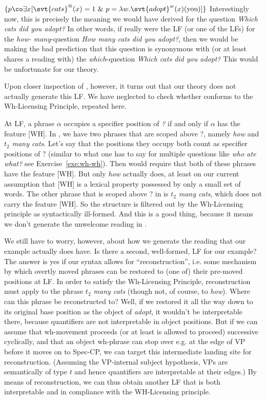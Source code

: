 \ex $\{p\co \exists x [\svt{cats}^{@}(x)=1\ \&\
p = \lambda w.\svt{adopt}^{w}(x)(\text{you})]\}$
\xe
%
Interestingly now, this is precisely the meaning we would have derived for the
question \emph{Which cats did you adopt?} In other words, if
 really were the LF (or one of the LFs) for the \emph{how-
  many}-question \emph{How many cats did you adopt?}, then we would be making
the bad prediction that this question is synonymous with (or at least shares a
reading with) the \emph{which}-question \emph{Which cats did you adopt?} This
would be unfortunate for our theory.

Upon closer inspection of , however, it turns out that our
theory does not actually generate this LF. We have neglected to check whether
\refx[d]{ex:LF-cats} conforms to the Wh-Licensing Principle, repeated here.

\ex
At LF, a phrase $\alpha$ occupies a specifier position of \emph{?} if and only
if $\alpha$ has the feature [WH].
\xe
%
In , we have two phrases that are scoped above ?, namely
\emph{how} and \emph{$t_{2}$ many cats}. Let’s say that the positions they
occupy both count as specifier positions of ? (similar to what one has to say
for multiple questions like \emph{who ate what?} \dash see
Exercise~\ref{exe:wh-wh}). Then \Last would require that both of these phrases
have the feature [WH]. But only \emph{how} actually does, at least on our
current assumption that [WH] is a lexical property possessed by only a small set
of words. The other phrase that is scoped above ? in  is
\emph{$t_{2}$ many cats}, which does not carry the feature [WH]. So the
structure \refx[d]{ex:LF-cats} is filtered out by the Wh-Licensing principle as
syntactically ill-formed. And this is a good thing, because it means we don't
generate the unwelcome reading in \LLast.

We still have to worry, however, about how we generate the reading that our
example actually does have. Is there a second, well-formed, LF for our example?
The answer is yes if our syntax allows for ``reconstruction'', i.e. some
mechanism by which overtly moved phrases can be restored to (one of) their
pre-moved positions at LF. In order to satisfy the Wh-Licensing Principle,
reconstruction must apply to the phrase \emph{$t_{2}$ many cats} (though not, of
course, to \emph{how}). Where can this phrase be reconstructed to? Well, if we
restored it all the way down to its original base position as the object of
\emph{adopt}, it wouldn't be interpretable there, because quantifiers are not
interpretable in object positions. But if we can assume that wh-movement
proceeds (or at least is allowed to proceed) successive cyclically, and that an
object wh-phrase can stop over e.g. at the edge of VP before it moves on to
Spec-CP, we can target this intermediate landing site for reconstruction.
(Assuming the VP-internal subject hypothesis, VPs are semantically of type $t$
and hence quantifiers are interpretable at their edges.) By means of
reconstruction, we can thus obtain another LF that is both interpretable and in
compliance with the WH-Licensing principle.


